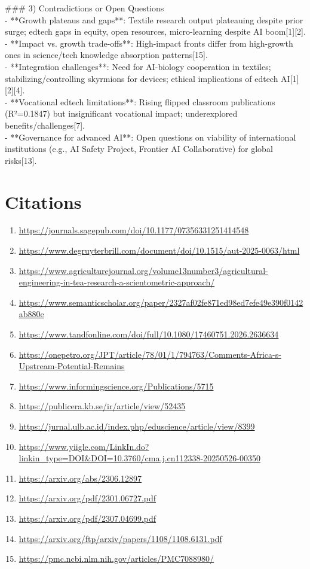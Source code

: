 \documentclass[11pt]{article}
\begin{document}
\#\#\# 3) Contradictions or Open Questions\\ - **Growth plateaus and gaps**: Textile research output plateauing despite prior surge; edtech gaps in equity, open resources, micro-learning despite AI boom[1][2].\\ - **Impact vs. growth trade-offs**: High-impact fronts differ from high-growth ones in science/tech knowledge absorption patterns[15].\\ - **Integration challenges**: Need for AI-biology cooperation in textiles; stabilizing/controlling skyrmions for devices; ethical implications of edtech AI[1][2][4].\\ - **Vocational edtech limitations**: Rising flipped classroom publications (R²=0.1847) but insignificant vocational impact; underexplored benefits/challenges[7].\\ - **Governance for advanced AI**: Open questions on viability of international institutions (e.g., AI Safety Project, Frontier AI Collaborative) for global risks[13].
\section*{Citations}
\begin{enumerate}
\item \url{https://journals.sagepub.com/doi/10.1177/07356331251414548}
\item \url{https://www.degruyterbrill.com/document/doi/10.1515/aut-2025-0063/html}
\item \url{https://www.agriculturejournal.org/volume13number3/agricultural-engineering-in-tea-research-a-scientometric-approach/}
\item \url{https://www.semanticscholar.org/paper/2327af02fe871ed98ed7efe49e390f0142ab880e}
\item \url{https://www.tandfonline.com/doi/full/10.1080/17460751.2026.2636634}
\item \url{https://onepetro.org/JPT/article/78/01/1/794763/Comments-Africa-s-Upstream-Potential-Remains}
\item \url{https://www.informingscience.org/Publications/5715}
\item \url{https://publicera.kb.se/ir/article/view/52435}
\item \url{https://jurnal.ulb.ac.id/index.php/eduscience/article/view/8399}
\item \url{https://www.yiigle.com/LinkIn.do?linkin_type=DOI&DOI=10.3760/cma.j.cn112338-20250526-00350}
\item \url{https://arxiv.org/abs/2306.12897}
\item \url{https://arxiv.org/pdf/2301.06727.pdf}
\item \url{https://arxiv.org/pdf/2307.04699.pdf}
\item \url{https://arxiv.org/ftp/arxiv/papers/1108/1108.6131.pdf}
\item \url{https://pmc.ncbi.nlm.nih.gov/articles/PMC7088980/}
\end{enumerate}
\end{document}

